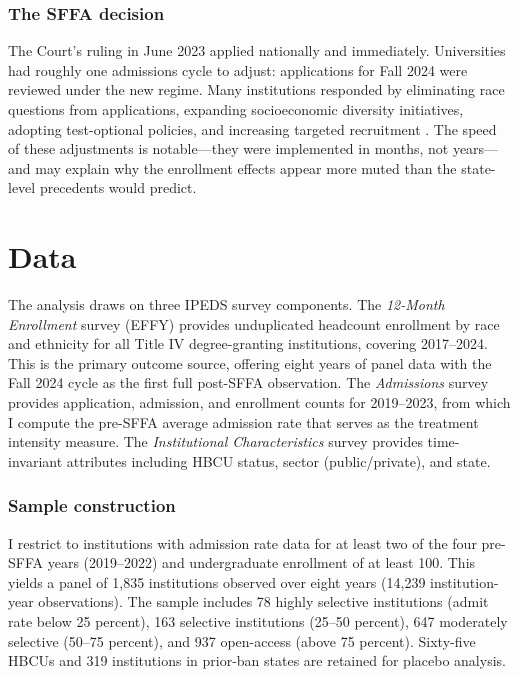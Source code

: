 \documentclass[12pt]{article}
\begin{document}
\subsubsection*{The SFFA decision} The Court's ruling in June 2023 applied nationally and immediately. Universities had roughly one admissions cycle to adjust: applications for Fall 2024 were reviewed under the new regime. Many institutions responded by eliminating race questions from applications, expanding socioeconomic diversity initiatives, adopting test-optional policies, and increasing targeted recruitment \citep{kahlenberg_2023}. The speed of these adjustments is notable---they were implemented in months, not years---and may explain why the enrollment effects appear more muted than the state-level precedents would predict.

\section{Data}

The analysis draws on three IPEDS survey components. The \textit{12-Month Enrollment} survey (EFFY) provides unduplicated headcount enrollment by race and ethnicity for all Title IV degree-granting institutions, covering 2017--2024. This is the primary outcome source, offering eight years of panel data with the Fall 2024 cycle as the first full post-SFFA observation. The \textit{Admissions} survey provides application, admission, and enrollment counts for 2019--2023, from which I compute the pre-SFFA average admission rate that serves as the treatment intensity measure. The \textit{Institutional Characteristics} survey provides time-invariant attributes including HBCU status, sector (public/private), and state.

\subsubsection*{Sample construction} I restrict to institutions with admission rate data for at least two of the four pre-SFFA years (2019--2022) and undergraduate enrollment of at least 100. This yields a panel of 1,835 institutions observed over eight years (14,239 institution-year observations). The sample includes 78 highly selective institutions (admit rate below 25 percent), 163 selective institutions (25--50 percent), 647 moderately selective (50--75 percent), and 937 open-access (above 75 percent). Sixty-five HBCUs and 319 institutions in prior-ban states are retained for placebo analysis.
\end{document}
